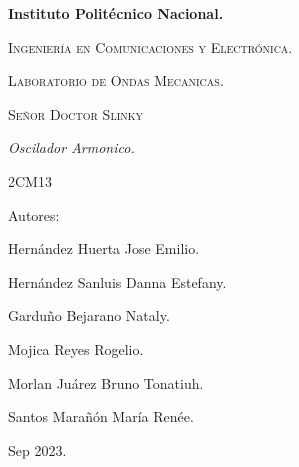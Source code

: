 \documentclass[10pt]{article}
\begin{document}
\pagestyle{fancy}
\cfoot{}


\lhead{}

\begin{titlepage}

	\begin{figure}[t]
		\hspace{0.6\textwidth}
	\end{figure}

	\centering
	{\bfseries\Huge Instituto Politécnico Nacional. \par}
	\vspace{1cm}
	{\scshape\Large Ingeniería en Comunicaciones y Electrónica. \par}
	\vspace{0.3cm}
	{\scshape\Large Laboratorio de Ondas Mecanicas.  \par}
	\vspace{1cm}
	{\scshape\Huge Señor Doctor Slinky \par}
	\vspace{1cm}
	{\itshape\Large Oscilador Armonico. \par}
	{\Large 2CM13\par}
	\vfill
	{\Large Autores: \par}
	{\Large Hernández Huerta Jose Emilio. \par}
	{\Large Hernández Sanluis Danna Estefany.  \par}
	{\Large Garduño Bejarano Nataly. \par}
	{\Large Mojica Reyes Rogelio.\par}
	{\Large Morlan Juárez Bruno Tonatiuh.  \par}
	{\Large Santos Marañón María Renée.\par}
	\vfill
	{\Large Sep 2023. \par}

\end{titlepage}
\end{document}
